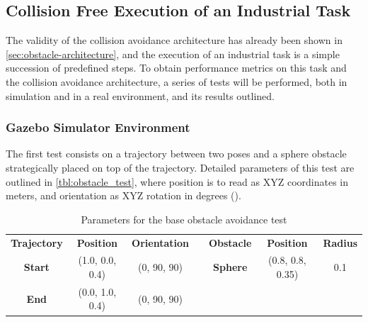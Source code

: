 


\subsection{Collision Free Execution of an Industrial Task}
\label{sec:colision_tests}

\par The validity of the collision avoidance architecture has already been shown in \autoref{sec:obstacle-architecture}, and the execution of an industrial task is a simple succession of predefined steps. To obtain performance metrics on this task and the collision avoidance architecture, a series of tests will be performed, both in simulation and in a real environment, and its results outlined.


\subsubsection{Gazebo Simulator Environment}

\par The first test consists on a trajectory between two poses and a sphere obstacle strategically placed on top of the trajectory. Detailed parameters of this test are outlined in \autoref{tbl:obstacle_test}, where position is to read as XYZ coordinates in meters, and orientation as XYZ rotation in degrees (\textdegree).

\begin{table}[h]
    \centering
    \begin{tabular}{|c|c|c|lccc}
    \cline{1-3} \cline{5-7}
    \textbf{Trajectory} & \textbf{Position} & \textbf{Orientation} & \multicolumn{1}{l|}{} & \multicolumn{1}{c|}{\textbf{Obstacle}} & \multicolumn{1}{c|}{\textbf{Position}} & \multicolumn{1}{c|}{\textbf{Radius}} \\ \cline{1-3} \cline{5-7} 
    \textbf{Start} & (1.0, 0.0, 0.4) & (0, 90, 90) & \multicolumn{1}{l|}{} & \multicolumn{1}{c|}{\textbf{Sphere}} & \multicolumn{1}{c|}{(0.8, 0.8, 0.35)} & \multicolumn{1}{c|}{0.1} \\ \cline{1-3} \cline{5-7} 
    \textbf{End} & (0.0, 1.0, 0.4) & (0, 90, 90) &  & \multicolumn{1}{l}{} & \multicolumn{1}{l}{} & \multicolumn{1}{l}{} \\ \cline{1-3}
    \end{tabular}
    \caption{Parameters for the base obstacle avoidance test}
    \label{tbl:obstacle_test}
\end{table}

